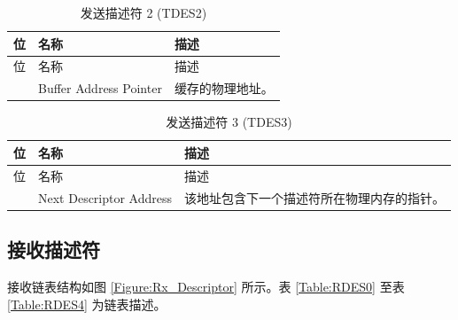 \documentclass[main\_\_CN.tex]{subfiles}
\begin{document}
\begin{longtable}[c]{ |p{1cm}|p{4cm}|p{10cm}| }
\caption{发送描述符 2 (TDES2)} \label{Table:TDES2}\\
\hline
\rowcolor{lightgray}
位&名称&描述\\
\hline
\endfirsthead
\hline
\rowcolor{lightgray}
位&名称&描述 \\\hline
\endhead
\endfoot
[31:0]& Buffer Address Pointer& 缓存的物理地址。\\\hline
\end{longtable}


\begin{longtable}[c]{ |p{1cm}|p{4cm}|p{10cm}| }
\caption{发送描述符 3 (TDES3)} \label{Table:TDES3}\\
\hline
\rowcolor{lightgray}
位 &名称 & 描述 \\
\hline
\endfirsthead
\hline
\rowcolor{lightgray}
位 &名称 & 描述  \\\hline
\endhead
\endfoot
[31:0]&Next Descriptor Address&该地址包含下一个描述符所在物理内存的指针。\\\hline
\end{longtable}


\subsection{接收描述符} 接收链表结构如图 \ref{Figure:Rx_Descriptor} 所示。表 \ref{Table:RDES0} 至表 \ref{Table:RDES4} 为链表描述。
\end{document}
